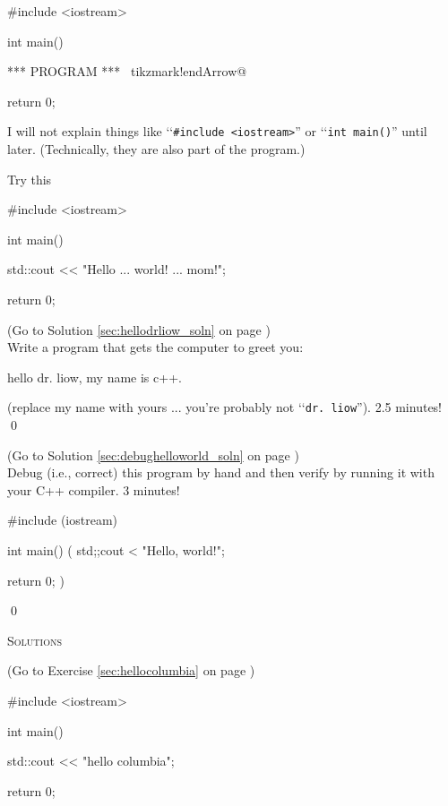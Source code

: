 \begin{console}[commandchars=\~\!\@]
#include <iostream>

int main()
{

    *** PROGRAM *** ~tikzmark!endArrow@
    
    return 0;
}
\end{console}

I will not explain things like 
\lq\lq \verb!#include <iostream>!'' or 
\lq\lq\verb!int main()!'' until later. 
(Technically, they are also part of  the program.)



Try this
\begin{console}
#include <iostream>

int main()
{
    std::cout << "Hello ... world! ... mom!\n";

    return 0;
}
\end{console}



\begin{ex} 
\label{sec:hellodrliow}
(Go to Solution \ref{sec:hellodrliow_soln} 
on page \pageref{sec:hellodrliow_soln}) 
\\
Write a program that gets the computer to greet you:
\begin{console}
hello dr. liow, my name is c++.
\end{console}
(replace my name with yours ...  you're probably not 
\lq\lq\verb!dr. liow!'').
2.5 minutes!
\qed
\end{ex}


\begin{ex}
\label{sec:debughelloworld}
(Go to Solution \ref{sec:debughelloworld_soln} 
on page \pageref{sec:debughelloworld_soln}) 
\\
Debug (i.e., correct) this program by hand 
and then verify by running it 
with your C++ compiler.
3 minutes!
\begin{console}
#include (iostream)

int main()
(
    std;;cout < "Hello, world!\n";

    return 0;
)
\end{console}
\qed
\end{ex}


\newpage\textsc{Solutions}

\begin{soln}\label{sec:hellocolumbia_soln}
(Go to Exercise \ref{sec:hellocolumbia} on page \pageref{sec:hellocolumbia})
\begin{console}
#include <iostream>

int main()
{
    std::cout << "hello columbia\n";

    return 0;
}
\end{console}
\end{soln}


